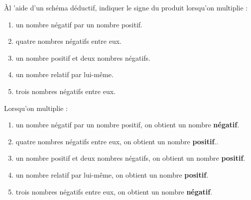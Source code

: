 \begin{exercice*}
    Àl 'aide d'un schéma déductif, indiquer le signe du produit lorsqu'on multiplie :
        \begin{enumerate}
            \item un nombre négatif par un nombre positif.
            \item quatre nombres négatifs entre eux.
            \item un nombre positif et deux nombres négatifs.
            \item un nombre relatif par lui-même.
            \item trois nombres négatifs entre eux.
        \end{enumerate}
\end{exercice*}
\begin{corrige}
    \phantom{rrr}    
    Lorsqu'on multiplie : 
    
        \begin{enumerate}
            \item un nombre négatif par un nombre positif, on obtient un nombre {\bfseries \color[HTML]{f15929}négatif}.
            \item quatre nombres négatifs entre eux, on obtient un nombre {\bfseries \color[HTML]{f15929}positif}..
            \item un nombre positif et deux nombres négatifs, on obtient un nombre {\bfseries \color[HTML]{f15929}positif}.
            \item un nombre relatif par lui-même, on obtient un nombre {\bfseries \color[HTML]{f15929}positif}.
            \item trois nombres négatifs entre eux, on obtient un nombre {\bfseries \color[HTML]{f15929}négatif}.
        \end{enumerate}
\end{corrige}

